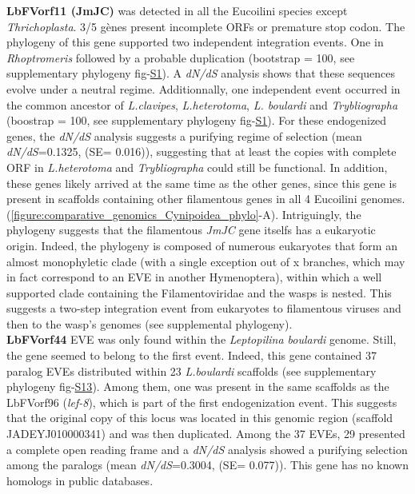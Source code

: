 \textbf{LbFVorf11 (JmJC)} was detected in all the Eucoilini species except \textit{Thrichoplasta}. 3/5 gènes present incomplete ORFs or premature stop codon.  The phylogeny of this gene supported two independent integration events. One in \textit{Rhoptromeris} followed by a probable duplication (bootstrap = 100, see supplementary phylogeny fig-\href{https://github.com/BenjaminGuinet/PhD_defense/blob/main/Supplementary_paper3/ALL_Eucoilini_filamentous_phylogenies.pdf}{S1}). A \textit{dN/dS} analysis shows that these sequences evolve under a neutral regime. Additionnally, one independent event occurred in the common ancestor of \textit{L.clavipes}, \textit{L.heterotoma}, \textit{L. boulardi} and \textit{Trybliographa} (boostrap = 100, see supplementary phylogeny fig-\href{https://github.com/BenjaminGuinet/PhD_defense/blob/main/Supplementary_paper3/ALL_Eucoilini_filamentous_phylogenies.pdf}{S1}). For these endogenized genes, the \textit{dN/dS} analysis suggests a purifying regime of selection (mean \textit{dN/dS}=0.1325, (SE= 0.016)), suggesting that at least the copies with complete ORF in \textit{L.heterotoma} and \textit{Trybliographa} could still be functional. In addition, these genes likely arrived at the same time as the other genes, since this gene is present in scaffolds containing other filamentous genes in all 4 Eucoilini genomes. (\figurename{\ref{figure:comparative_genomics_Cynipoidea_phylo}}-A). Intriguingly, the phylogeny suggests that the filamentous \textit{JmJC} gene itselfs has a eukaryotic origin. Indeed, the phylogeny is composed of numerous eukaryotes that form an almost monophyletic clade (with a single exception out of x branches, which may in fact correspond to an EVE in another Hymenoptera), within which a well supported clade containing the Filamentoviridae and the wasps is nested. This suggests a two-step integration event from eukaryotes to filamentous viruses and then to the wasp's genomes (see supplemental phylogeny).\\

\textbf{LbFVorf44} EVE was only found within the \textit{Leptopilina boulardi} genome. Still, the gene seemed to belong to the first event. Indeed, this gene contained 37 paralog EVEs distributed within 23 \textit{L.boulardi} scaffolds (see supplementary phylogeny fig-\href{https://github.com/BenjaminGuinet/PhD_defense/blob/main/Supplementary_paper3/ALL_Eucoilini_filamentous_phylogenies.pdf}{S13}). Among them, one was present in the same scaffolds as the LbFVorf96 (\textit{lef-8}), which is part of the first endogenization event. This suggests that the original copy of this locus was located in this genomic region  (scaffold JADEYJ010000341) and was then duplicated. Among the 37 EVEs, 29 presented a complete open reading frame and a \textit{dN/dS} analysis showed a purifying selection among the paralogs (mean \textit{dN/dS}=0.3004, (SE= 0.077)). This gene has no known homologs in public databases.\\

